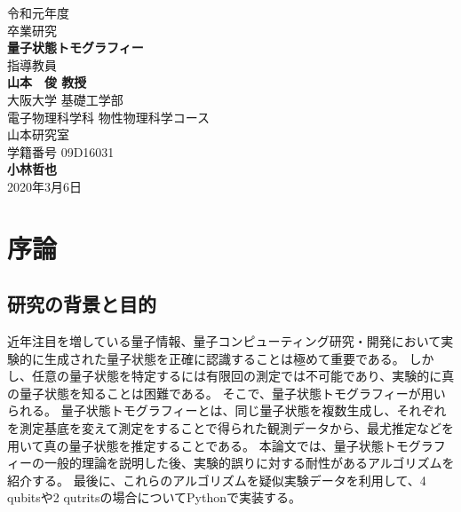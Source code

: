 \documentclass[11pt,a4j,notitlepage]{jreport}
\def\HUGE{\fontsize{32pt}{36pt}\selectfont} %
\begin{document}
	\begin{titlepage}
		\begin{center}\begin{LARGE}
			\vspace{1em}
			{令和元年度}\\
			\vspace{1.5em}
			{卒業研究}\vspace{3em}\\
			\textbf{\HUGE 量子状態トモグラフィー}\\
			\vspace{4em}
			{\LARGE 指導教員}\\
			\vspace{0.8em}
			{\Huge\bf 山本　俊 教授}\\
			\vspace{0.2\vsize}
			{大阪大学 基礎工学部\\ 電子物理科学科 物性物理科学コース\\ 山本研究室\\学籍番号 09D16031}\\
			\vspace{0.8em}
			{\Huge\bf 小林哲也}\\
			\vspace{3em}
			{\Large 2020年3月6日}
		\end{LARGE}\end{center}
	\end{titlepage}


	\setcounter{tocdepth}{2}
	\tableofcontents

	\clearpage

	\listoffigures

	\clearpage


	\chapter{序論}
	\section{研究の背景と目的}

	近年注目を増している量子情報、量子コンピューティング研究・開発において実験的に生成された量子状態を正確に認識することは極めて重要である。
	しかし、任意の量子状態を特定するには有限回の測定では不可能であり、実験的に真の量子状態を知ることは困難である。
	そこで、量子状態トモグラフィーが用いられる。
	量子状態トモグラフィーとは、同じ量子状態を複数生成し、それぞれを測定基底を変えて測定をすることで得られた観測データから、最尤推定などを用いて真の量子状態を推定することである。
	本論文では、量子状態トモグラフィーの一般的理論を説明した後、実験的誤りに対する耐性があるアルゴリズムを紹介する。
	最後に、これらのアルゴリズムを疑似実験データを利用して、4 qubitsや2 qutritsの場合についてPythonで実装する。
\end{document}
